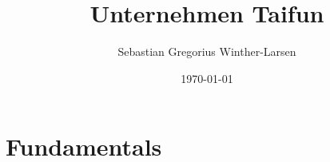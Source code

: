 \documentclass[twoside, english, notitlepage, 10pt]{uiofysmaster}
\author{Sebastian Gregorius Winther-Larsen}
\title{Unternehmen Taifun}
\date{\today}
\begin{document}
\frontmatter
    \maketitle

    \tableofcontents

\mainmatter

    \part{Fundamentals}

        

        
\printbibliography
\end{document}
